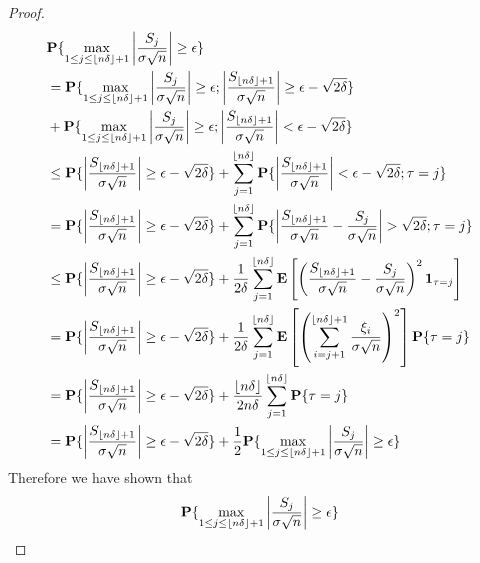 \begin{proof}
\begin{align*}
&\textbf{P}\{\max_{1 \leq j \leq \lfloor n\delta \rfloor + 1} \left \vert \frac{S_j}{\sigma \sqrt{n}} \right \vert \geq \epsilon
  \} \\
&=\textbf{P}\{\max_{1 \leq j \leq \lfloor n\delta \rfloor + 1}
  \left \vert \frac{S_j}{\sigma \sqrt{n}} \right \vert \geq \epsilon; 
\left \vert \frac{S_{\lfloor n\delta \rfloor+1}}{\sigma \sqrt{n}} \right \vert  \geq \epsilon -
\sqrt{2\delta}\} \\
&+ \textbf{P}\{\max_{1 \leq j \leq \lfloor n\delta \rfloor + 1}
  \left \vert \frac{S_j}{\sigma \sqrt{n}} \right \vert \geq \epsilon; 
\left \vert \frac{S_{\lfloor n\delta \rfloor+1}}{\sigma \sqrt{n}} \right \vert < 
  \epsilon - \sqrt{2\delta}\} \\
&\leq \textbf{P}\{\left \vert \frac{S_{\lfloor n\delta \rfloor+1}}{\sigma \sqrt{n}} \right \vert
  \geq \epsilon - \sqrt{2\delta}\} + 
\sum_{j=1}^{\lfloor n\delta \rfloor}
\textbf{P}\{\left \vert \frac{S_{\lfloor n\delta \rfloor+1}}{\sigma \sqrt{n}} \right \vert <
  \epsilon - \sqrt{2\delta}; \tau = j\} \\
&= \textbf{P}\{\left \vert \frac{S_{\lfloor n\delta \rfloor+1}}{\sigma \sqrt{n}} \right \vert
  \geq \epsilon - \sqrt{2\delta}\} + 
\sum_{j=1}^{\lfloor n\delta \rfloor}
\textbf{P}\{\left \vert \frac{S_{\lfloor n\delta \rfloor+1}}{\sigma \sqrt{n}} -
    \frac{S_j}{\sigma \sqrt{n}} \right \vert > \sqrt{2\delta}; \tau = j\} \\
&\leq \textbf{P}\{\left \vert \frac{S_{\lfloor n\delta \rfloor+1}}{\sigma \sqrt{n}} \right \vert
  \geq \epsilon - \sqrt{2\delta}\} + 
\frac{1}{2\delta}\sum_{j=1}^{\lfloor n\delta \rfloor}
\textbf{E}\left[\left(
    \frac{S_{\lfloor n\delta \rfloor+1}}{\sigma \sqrt{n}} - \frac{S_j}{\sigma
      \sqrt{n}} \right)^2 \textbf{1}_{\tau = j}\right] \\
&= \textbf{P}\{\left \vert \frac{S_{\lfloor n\delta \rfloor+1}}{\sigma \sqrt{n}} \right \vert
  \geq \epsilon - \sqrt{2\delta}\} + 
\frac{1}{2\delta}\sum_{j=1}^{\lfloor n\delta \rfloor}
\textbf{E}\left[\left( \sum_{i=j+1}^{\lfloor n\delta \rfloor+1}
    \frac{\xi_i}{\sigma\sqrt{n}} \right)^2 \right] \textbf{P}\{\tau = j\} \\
&= \textbf{P}\{\left \vert \frac{S_{\lfloor n\delta \rfloor+1}}{\sigma \sqrt{n}} \right \vert
  \geq \epsilon - \sqrt{2\delta}\} + 
\frac{\lfloor n\delta \rfloor}{2 n \delta}\sum_{j=1}^{\lfloor n\delta \rfloor}
\textbf{P}\{\tau = j\} \\
&= \textbf{P}\{\left \vert \frac{S_{\lfloor n\delta \rfloor+1}}{\sigma \sqrt{n}} \right \vert
  \geq \epsilon - \sqrt{2\delta}\} + 
\frac{1}{2}\textbf{P}\{\max_{1 \leq j \leq \lfloor n\delta \rfloor + 1} \left \vert \frac{S_j}{\sigma \sqrt{n}} \right \vert \geq \epsilon\}
\end{align*}
Therefore we have shown that 
\begin{align*}
\probability{\max_{1 \leq j \leq \floor{n\delta} + 1} \abs{\frac{S_j}{\sigma \sqrt{n}}} \geq \epsilon}

\end{align*}
\end{proof}
